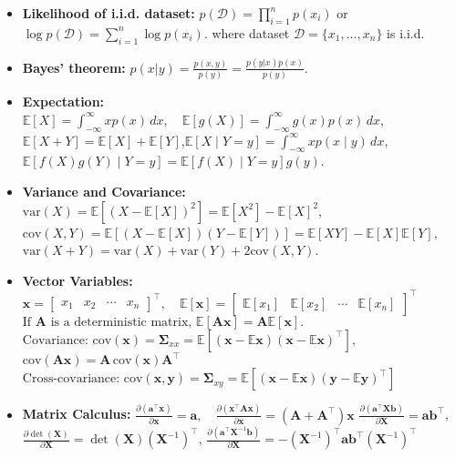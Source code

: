 \documentclass[10pt]{article}
\begin{document}
\begin{multicols*}{3}
\begin{itemize}[label=$\cdot$,leftmargin=0pt]
\item\textbf{Likelihood of i.i.d. dataset:} 
$p(\mathcal{D}) = \prod_{i=1}^{n} p(x_i)$ or $\log p(\mathcal{D}) = \sum_{i=1}^{n} \log p(x_i)$. 
where dataset \( \mathcal{D} = \{x_1, \dots, x_n\} \) is i.i.d.
\item\textbf{Bayes' theorem:}
$p(x | y) = \frac{p(x,y)}{p(y)} = \frac{p(y | x) p(x)}{p(y)}$.
\item\textbf{Expectation:}  %
$\mathbb{E}[X] = \int_{-\infty}^{\infty} x p(x) \,dx, \quad \mathbb{E}[g(X)] = \int_{-\infty}^{\infty} g(x) p(x) \,dx$,\quad
$\mathbb{E}[X + Y] = \mathbb{E}[X] + \mathbb{E}[Y]$,\quad$\mathbb{E}[X \mid Y = y] = \int_{-\infty}^{\infty} x p(x \mid y) \,dx$,\quad
$\mathbb{E}[f(X) g(Y) \mid Y = y] = \mathbb{E}[f(X) \mid Y = y] g(y)$.
\item\textbf{Variance and Covariance:}  %
$\text{var}(X) = \mathbb{E}[(X - \mathbb{E}[X])^2] = \mathbb{E}[X^2] - \mathbb{E}[X]^2$,\quad
$\text{cov}(X,Y) = \mathbb{E}[(X - \mathbb{E}[X])(Y - \mathbb{E}[Y])] = \mathbb{E}[XY] - \mathbb{E}[X] \mathbb{E}[Y]$,\quad
$\text{var}(X + Y) = \text{var}(X) + \text{var}(Y) + 2 \text{cov}(X,Y)$.
\item \textbf{Vector Variables:}
$
\mathbf{x} =
\begin{bmatrix}
x_1 & x_2 & \cdots & x_n
\end{bmatrix}^{\top}, \quad
\mathbb{E}[\mathbf{x}] =
\begin{bmatrix}
\mathbb{E}[x_1] & \mathbb{E}[x_2] & \cdots & \mathbb{E}[x_n]
\end{bmatrix}^{\top}
$\quad
$\text{If } \mathbf{A} \text{ is a deterministic matrix, } \mathbb{E}[\mathbf{A} \mathbf{x}] = \mathbf{A} \mathbb{E}[\mathbf{x}].$\quad
$\text{Covariance: } \text{cov}(\mathbf{x}) = \mathbf{\Sigma}_{xx} = \mathbb{E}[(\mathbf{x} - \mathbb{E}\mathbf{x})(\mathbf{x} - \mathbb{E}\mathbf{x})^\top],$\quad
$\text{cov}(\mathbf{A} \mathbf{x}) = \mathbf{A} \, \text{cov}(\mathbf{x}) \mathbf{A}^\top$\quad
$\text{Cross-covariance: } \text{cov}(\mathbf{x}, \mathbf{y}) = \mathbf{\Sigma}_{xy} = \mathbb{E}[(\mathbf{x} - \mathbb{E}\mathbf{x})(\mathbf{y} - \mathbb{E}\mathbf{y})^\top]$
\item \textbf{Matrix Calculus:}
$\frac{\partial (\mathbf{a}^\top \mathbf{x})}{\partial \mathbf{x}} = \mathbf{a}, \quad
\frac{\partial (\mathbf{x}^\top \mathbf{A} \mathbf{x})}{\partial \mathbf{x}} = (\mathbf{A} + \mathbf{A}^\top) \mathbf{x}$\quad
$\frac{\partial (\mathbf{a}^\top \mathbf{X} \mathbf{b})}{\partial \mathbf{X}} = \mathbf{a} \mathbf{b}^\top$, \quad
$\frac{\partial \det(\mathbf{X})}{\partial \mathbf{X}} = \det(\mathbf{X}) (\mathbf{X}^{-1})^\top$, \quad
$\frac{\partial (\mathbf{a}^\top \mathbf{X}^{-1} \mathbf{b})}{\partial \mathbf{X}} = -(\mathbf{X}^{-1})^\top \mathbf{a} \mathbf{b}^\top (\mathbf{X}^{-1})^\top$


\end{itemize}
\end{multicols*}
\end{document}
